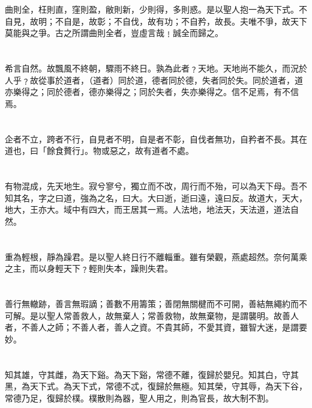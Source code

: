\documentclass[11pt,oneside]{article}
\begin{document}
\section{}
\label{sec:orgheadline22}
曲則全，枉則直，窪則盈，敝則新，少則得，多則惑。是以聖人抱一為天下式。不自見，故明；不自是，故彰；不自伐，故有功；不自矜，故長。夫唯不爭，故天下莫能與之爭。古之所謂曲則全者，豈虛言哉﹗誠全而歸之。

\section{}
\label{sec:orgheadline23}
希言自然。故飄風不終朝，驟雨不終日。孰為此者﹖天地。天地尚不能久，而況於人乎﹖故從事於道者，（道者）同於道，德者同於德，失者同於失。同於道者，道亦樂得之；同於德者，德亦樂得之；同於失者，失亦樂得之。信不足焉，有不信焉。

\section{}
\label{sec:orgheadline24}
企者不立，跨者不行，自見者不明，自是者不彰，自伐者無功，自矜者不長。其在道也，曰「餘食贅行」。物或惡之，故有道者不處。

\section{}
\label{sec:orgheadline25}
有物混成，先天地生。寂兮寥兮，獨立而不改，周行而不殆，可以為天下母。吾不知其名，字之曰道，強為之名，曰大。大曰逝，逝曰遠，遠曰反。故道大，天大，地大，王亦大。域中有四大，而王居其一焉。人法地，地法天，天法道，道法自然。

\section{}
\label{sec:orgheadline26}
重為輕根，靜為躁君。是以聖人終日行不離輜重。雖有榮觀，燕處超然。奈何萬乘之主，而以身輕天下﹖輕則失本，躁則失君。

\section{}
\label{sec:orgheadline27}
善行無轍跡，善言無瑕謫；善數不用籌策；善閉無關楗而不可開，善結無繩約而不可解。是以聖人常善救人，故無棄人；常善救物，故無棄物，是謂襲明。故善人者，不善人之師；不善人者，善人之資。不貴其師，不愛其資，雖智大迷，是謂要妙。

\section{}
\label{sec:orgheadline28}
知其雄，守其雌，為天下谿。為天下谿，常德不離，復歸於嬰兒。知其白，守其黑，為天下式。為天下式，常德不忒，復歸於無極。知其榮，守其辱，為天下谷，常德乃足，復歸於樸。樸散則為器，聖人用之，則為官長，故大制不割。
\end{document}

